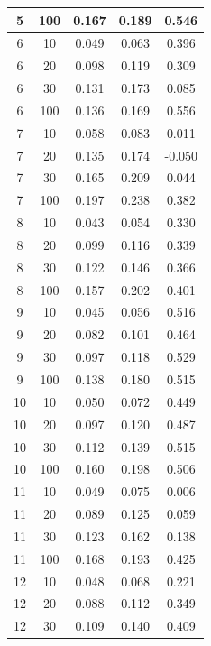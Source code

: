 \begin{longtable}{ |c|c|c|c|c| }
            5 & 100 & 0.167 & 0.189 & 0.546 \\ \hline
            6 & 10 & 0.049 & 0.063 & 0.396 \\ \hline
            6 & 20 & 0.098 & 0.119 & 0.309 \\ \hline
            6 & 30 & 0.131 & 0.173 & 0.085 \\ \hline
            6 & 100 & 0.136 & 0.169 & 0.556 \\ \hline
            7 & 10 & 0.058 & 0.083 & 0.011 \\ \hline
            7 & 20 & 0.135 & 0.174 & -0.050 \\ \hline
            7 & 30 & 0.165 & 0.209 & 0.044 \\ \hline
            7 & 100 & 0.197 & 0.238 & 0.382 \\ \hline
            8 & 10 & 0.043 & 0.054 & 0.330 \\ \hline
            8 & 20 & 0.099 & 0.116 & 0.339 \\ \hline
            8 & 30 & 0.122 & 0.146 & 0.366 \\ \hline
            8 & 100 & 0.157 & 0.202 & 0.401 \\ \hline
            9 & 10 & 0.045 & 0.056 & 0.516 \\ \hline
            9 & 20 & 0.082 & 0.101 & 0.464 \\ \hline
            9 & 30 & 0.097 & 0.118 & 0.529 \\ \hline
            9 & 100 & 0.138 & 0.180 & 0.515 \\ \hline
            10 & 10 & 0.050 & 0.072 & 0.449 \\ \hline
            10 & 20 & 0.097 & 0.120 & 0.487 \\ \hline
            10 & 30 & 0.112 & 0.139 & 0.515 \\ \hline
            10 & 100 & 0.160 & 0.198 & 0.506 \\ \hline
            11 & 10 & 0.049 & 0.075 & 0.006 \\ \hline
            11 & 20 & 0.089 & 0.125 & 0.059 \\ \hline
            11 & 30 & 0.123 & 0.162 & 0.138 \\ \hline
            11 & 100 & 0.168 & 0.193 & 0.425 \\ \hline
            12 & 10 & 0.048 & 0.068 & 0.221 \\ \hline
            12 & 20 & 0.088 & 0.112 & 0.349 \\ \hline
            12 & 30 & 0.109 & 0.140 & 0.409 \\ \hline

\end{longtable}
